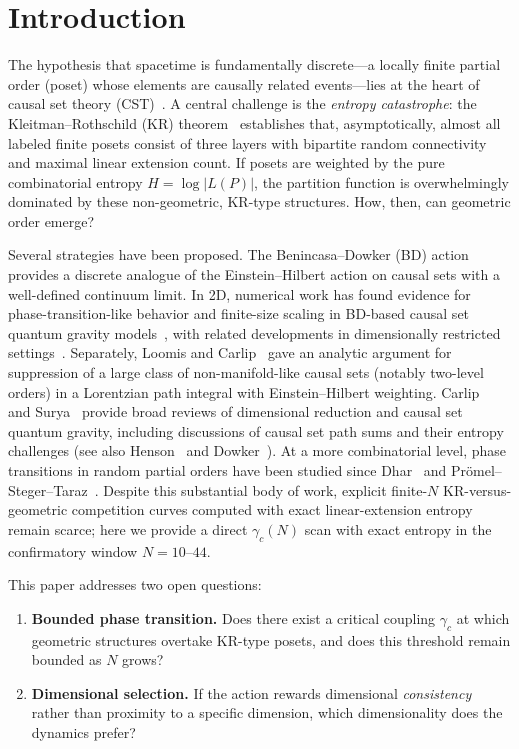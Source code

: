 \documentclass[12pt,a4paper]{article}
\begin{document}
\section{Introduction}
\label{sec:intro}

The hypothesis that spacetime is fundamentally discrete---a locally finite
partial order (poset) whose elements are causally related events---lies at the
heart of causal set theory (CST)~\cite{bombelli1987,sorkin2005}. A central
challenge is the \emph{entropy catastrophe}: the Kleitman--Rothschild (KR)
theorem~\cite{kleitman1975} establishes that, asymptotically, almost all labeled
finite posets consist of three layers with bipartite random connectivity and
maximal linear extension count. If posets are weighted by the pure combinatorial
entropy $H = \log|L(P)|$, the partition function is overwhelmingly dominated by
these non-geometric, KR-type structures. How, then, can geometric order emerge?

Several strategies have been proposed. The Benincasa--Dowker (BD)
action~\cite{benincasa2010,benincasa2011} provides a discrete analogue of the
Einstein--Hilbert action on causal sets with a well-defined continuum limit.
In 2D, numerical work has found evidence for phase-transition-like behavior and
finite-size scaling in BD-based causal set quantum gravity
models~\cite{surya2012,glaser2018}, with related developments in dimensionally
restricted settings~\cite{cunningham2020}. Separately, Loomis and
Carlip~\cite{loomis2018} gave an analytic argument for suppression of a large
class of non-manifold-like causal sets (notably two-level orders) in a
Lorentzian path integral with Einstein--Hilbert weighting. Carlip~\cite{carlip2017}
and Surya~\cite{surya2019} provide broad reviews of dimensional reduction and
causal set quantum gravity, including discussions of causal set path sums and
their entropy challenges (see also Henson~\cite{henson2006} and
Dowker~\cite{dowker2005}). At a more combinatorial level, phase transitions in
random partial orders have been studied since Dhar~\cite{dhar1978} and
Pr{\"o}mel--Steger--Taraz~\cite{promel2001}. Despite this substantial body of
work, explicit finite-$N$ KR-versus-geometric competition curves computed with
exact linear-extension entropy remain scarce; here we provide a direct
$\gamma_c(N)$ scan with exact entropy in the confirmatory window $N=10$--$44$.

This paper addresses two open questions:

\begin{enumerate}[nosep]
\item \textbf{Bounded phase transition.} Does there exist a critical coupling
$\gamma_c$ at which geometric structures overtake KR-type posets, and does this
threshold remain bounded as $N$ grows?
\item \textbf{Dimensional selection.} If the action rewards dimensional
\emph{consistency} rather than proximity to a specific dimension, which
dimensionality does the dynamics prefer?
\end{enumerate}
\end{document}
